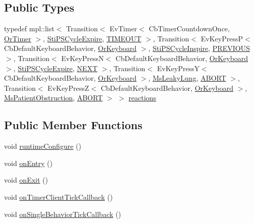 \subsection*{Public Types}
\begin{DoxyCompactItemize}
\item 
typedef mpl\+::list$<$ Transition$<$ Ev\+Timer$<$ Cb\+Timer\+Countdown\+Once, \hyperlink{classsm__respira__1_1_1OrTimer}{Or\+Timer} $>$, \hyperlink{structsm__respira__1_1_1ps__cycle__inner__states_1_1StiPSCycleExpire}{Sti\+P\+S\+Cycle\+Expire}, \hyperlink{structsm__respira__1_1_1ps__cycle__inner__states_1_1StiPSCyclePlateau_1_1TIMEOUT}{T\+I\+M\+E\+O\+UT} $>$, Transition$<$ Ev\+Key\+PressP$<$ Cb\+Default\+Keyboard\+Behavior, \hyperlink{classsm__respira__1_1_1OrKeyboard}{Or\+Keyboard} $>$, \hyperlink{structsm__respira__1_1_1ps__cycle__inner__states_1_1StiPSCycleInspire}{Sti\+P\+S\+Cycle\+Inspire}, \hyperlink{structsm__respira__1_1_1ps__cycle__inner__states_1_1StiPSCyclePlateau_1_1PREVIOUS}{P\+R\+E\+V\+I\+O\+US} $>$, Transition$<$ Ev\+Key\+PressN$<$ Cb\+Default\+Keyboard\+Behavior, \hyperlink{classsm__respira__1_1_1OrKeyboard}{Or\+Keyboard} $>$, \hyperlink{structsm__respira__1_1_1ps__cycle__inner__states_1_1StiPSCycleExpire}{Sti\+P\+S\+Cycle\+Expire}, \hyperlink{structsm__respira__1_1_1ps__cycle__inner__states_1_1StiPSCyclePlateau_1_1NEXT}{N\+E\+XT} $>$, Transition$<$ Ev\+Key\+PressY$<$ Cb\+Default\+Keyboard\+Behavior, \hyperlink{classsm__respira__1_1_1OrKeyboard}{Or\+Keyboard} $>$, \hyperlink{classsm__respira__1_1_1MsLeakyLung}{Ms\+Leaky\+Lung}, \hyperlink{classABORT}{A\+B\+O\+RT} $>$, Transition$<$ Ev\+Key\+PressZ$<$ Cb\+Default\+Keyboard\+Behavior, \hyperlink{classsm__respira__1_1_1OrKeyboard}{Or\+Keyboard} $>$, \hyperlink{classsm__respira__1_1_1MsPatientObstruction}{Ms\+Patient\+Obstruction}, \hyperlink{classABORT}{A\+B\+O\+RT} $>$ $>$ \hyperlink{structsm__respira__1_1_1ps__cycle__inner__states_1_1StiPSCyclePlateau_a8bbf7a1639dec1403c8a64cee4814687}{reactions}
\end{DoxyCompactItemize}
\subsection*{Public Member Functions}
\begin{DoxyCompactItemize}
\item 
void \hyperlink{structsm__respira__1_1_1ps__cycle__inner__states_1_1StiPSCyclePlateau_a863e247bf1710ebd5350f61c7264db42}{runtime\+Configure} ()
\item 
void \hyperlink{structsm__respira__1_1_1ps__cycle__inner__states_1_1StiPSCyclePlateau_adc4eafbbb1e85f3ed749a473a5f8da19}{on\+Entry} ()
\item 
void \hyperlink{structsm__respira__1_1_1ps__cycle__inner__states_1_1StiPSCyclePlateau_a867ba6070391a8a498aa1801c1af0867}{on\+Exit} ()
\item 
void \hyperlink{structsm__respira__1_1_1ps__cycle__inner__states_1_1StiPSCyclePlateau_a474f210a65f1b5769b4debd1e2d555f8}{on\+Timer\+Client\+Tick\+Callback} ()
\item 
void \hyperlink{structsm__respira__1_1_1ps__cycle__inner__states_1_1StiPSCyclePlateau_aa5baa83b5b2a295e6a8b8dbac7fe5b01}{on\+Single\+Behavior\+Tick\+Callback} ()
\end{DoxyCompactItemize}
